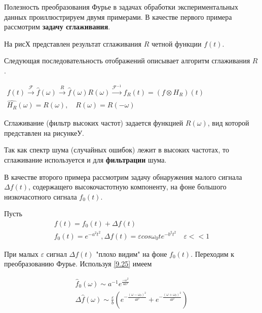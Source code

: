 Полезность преобразования Фурье в задачах обработки экспериментальных данных  проиллюстрируем двумя примерами.
В качестве первого примера рассмотрим \textbf{задачу сглаживания}.

На рисХ представлен результат сглаживания $R$ четной функции $f(t)$.

Следующая последовательность отображений описывает алгоритм сглаживания $R$.

\begin{math}
\begin{gathered}
f(t) \xrightarrow{\mathscr{F}} \hat{f}(\omega) \xrightarrow{R} \hat{f}(\omega)R(\omega)  \xrightarrow{\mathscr{F}^{-1}} f_R(t) =(f\otimes H_R)(t) \\ 
\hat{H_R}(\omega)=R(\omega), \quad R(\omega)=R(-\omega) 
\end{gathered}
\end{math}


Сглаживание (фильтр высоких частот) задается функцией $R(\omega)$, вид которой представлен на рисункеУ.

Так как спектр шума (случайных ошибок) лежит в высоких частотах, то сглаживание используется и для \textbf{фильтрации} шума.

В качестве второго примера рассмотрим задачу обнаружения малого сигнала $\Delta f(t)$, содержащего высокочастотную компоненту, на фоне большого низкочасотного сигнала $f_0(t)$.

Пусть
\begin{equation}\label{9.28}
\begin{gathered}
f(t)=f_0(t)+\Delta f(t) \\
f_0(t)=e^{-a^2t^2}, \Delta f(t)= \varepsilon cos \omega_0 t e^{-b^2t^2} \quad \varepsilon << 1
\end{gathered}
\end{equation}

При малых $\varepsilon$ сигнал $\Delta f(t)$ "плохо видим" на фоне $f_0(t)$. Переходим к преобразованию Фурье. Используя \ref{9.25} имеем


\begin{equation}\label{9.29}
\begin{gathered}
\hat{f}_0(\omega) \sim a^{-1} e^{\frac{-\omega^2}{4a^2}} \\
\Delta\hat{f}(\omega) \sim \frac{\varepsilon}{b} \left(e^{-\frac{(\omega-\omega_0)^2}{4b^2}} + e^{-\frac{(\omega+\omega_0)^2}{4b^2}} \right)
\end{gathered}
\end{equation}

